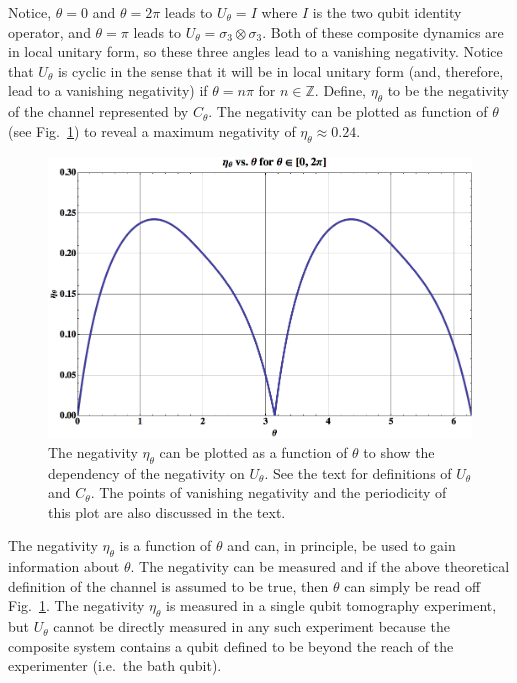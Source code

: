 Notice, $\theta=0$ and $\theta=2\pi$ leads to $U_\theta=I$ where $I$ is the two qubit identity operator, and $\theta=\pi$ leads to $U_\theta=\sigma_3\otimes\sigma_3$.  Both of these composite dynamics are in local unitary form, so these three angles lead to a vanishing negativity.  Notice that $U_\theta$ is cyclic in the sense that it will be in local unitary form (and, therefore, lead to a vanishing negativity) if $\theta=n\pi$ for $n\in\mathbb{Z}$.  Define, $\eta_\theta$ to be the negativity of the channel represented by $C_\theta$.  The negativity can be plotted as function of $\theta$ (see Fig.\ \ref{fig:etatheta}) to reveal a maximum negativity of $\eta_\theta\approx 0.24$.  
\begin{figure}[h!t]
\centering
\includegraphics[scale=0.42]{etathetaII.png}
\caption{The negativity $\eta_\theta$ can be plotted as a function of $\theta$ to show the dependency of the negativity on $U_\theta$.  See the text for definitions of $U_\theta$ and $C_\theta$.  The points of vanishing negativity and the periodicity of this plot are also discussed in the text. }
\label{fig:etatheta}
\end{figure}

The negativity $\eta_\theta$ is a function of $\theta$ and can, in principle, be used to gain information about $\theta$.  The negativity can be measured and if the above theoretical definition of the channel is assumed to be true, then $\theta$ can simply be read off Fig.\ \ref{fig:etatheta}.  The negativity $\eta_\theta$ is measured in a single qubit tomography experiment, but $U_\theta$ cannot be directly measured in any such experiment because the composite system contains a qubit defined to be beyond the reach of the experimenter (i.e.\ the bath qubit).   

